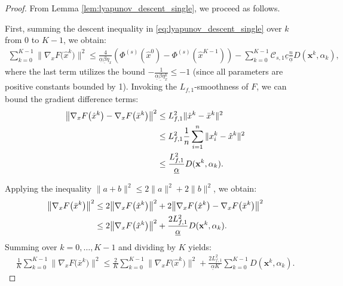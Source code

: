 \documentclass{article}
\theoremstyle{plain}
\theoremstyle{definition}
\theoremstyle{remark}
\begin{document}
\begin{proof}
    From Lemma \ref{lem:lyapunov_descent_single}, we proceed as follows.
    
    First, summing the descent inequality in \eqref{eq:lyapunov_descent_single} over $k$ from $0$ to $K-1$, we obtain:
    \begin{align}\label{eq:summed_descent}
        \sum_{k=0}^{K-1} \big\|\nabla_{x} F\big({\hat{x}}^k\big) \big\|^{2} 
        \leq 
        \frac{4}{\underline{\alpha}\underline{\beta}\eta_{x}} \left(\Phi^{(s)}({\hat{x}}^{0}) - \Phi^{(s)}({\hat{x}}^{K-1}) \right) 
        - \sum_{k=0}^{K-1} \mathcal{C}_{s,1} \underline{c} \frac{n}{\underline{\alpha}} D(\mathbf{x}^{k}, \alpha_{k}),
    \end{align}
where the last term utilizes the bound $-\frac{1}{\underline{\alpha}\underline{\beta}\eta_{x}^{k}}\leq-1$ (since all parameters are positive constants bounded by 1).
    Invoking the $L_{f,1}$-smoothness of $F$, we can bound the gradient difference terms:
    \begin{align}\label{eq:grad_diff_bound}
        \big\|\nabla_{x} F\big({\hat{x}}^k\big) -\nabla_{x} F\big({\bar{x}}^k\big) \big\|^{2}
        &\leq L_{f,1}^{2}\| {\hat{x}}^k - {\bar{x}}^k\|^{2} \notag \\
        &\leq L_{f,1}^{2} \frac{1}{n}\sum_{i=1}^{n}\| x_{i}^k-{\hat{x}}^k \|^{2} \notag \\
        &\leq \frac{L_{f,1}^{2}}{\underline{\alpha}} D(\mathbf{x}^{k},\alpha_{k}).
    \end{align}

Applying the inequality $\|a+b\|^2 \leq 2\|a\|^2 + 2\|b\|^2$, we obtain:
\begin{align}\label{STmesure_single}
    \big\|\nabla_{x} F\big({\bar{x}}^k\big) \big\|^{2} 
    &\leq 2\big\|\nabla_{x} F\big({\hat{x}}^k\big) \big\|^{2} + 2\big\| \nabla_{x} F\big({\hat{x}}^k\big)- \nabla_{x} F\big({\bar{x}}^k\big) \big\|^{2} \notag\\
    &\leq 2\big\|\nabla_{x} F\big({\hat{x}}^k\big) \big\|^{2} + \frac{2 L_{f,1}^{2}}{\underline{\alpha}} D(\mathbf{x}^{k},\alpha_{k}).
\end{align}
Summing over $k=0, \dots, K-1$ and dividing by $K$ yields:
\begin{align*}
    \frac{1}{K} \sum_{k=0}^{K-1}\big\|\nabla_{x} F\big({\bar{x}}^k\big) \big\|^{2} 
    \leq \frac{2}{K} \sum_{k=0}^{K-1}\big\|\nabla_{x} F\big({\hat{x}}^k\big) \big\|^{2} + \frac{2 L_{f,1}^{2}}{\underline{\alpha} K} \sum_{k=0}^{K-1} D(\mathbf{x}^{k},\alpha_{k}).
\end{align*}
    

\end{proof}
\end{document}

